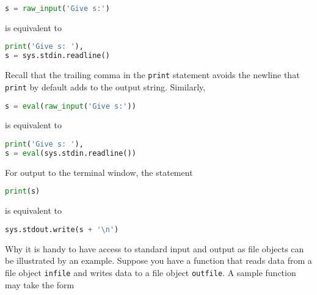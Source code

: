 \documentclass[graybox,sectrefs,envcountresetchap,open=right,final]{svmonodo}
\begin{document}
\begin{lstlisting}[language=python,style=simple,xleftmargin=2mm]
s = raw_input('Give s:')

\end{lstlisting}

is equivalent to




\begin{lstlisting}[language=python,style=simple,xleftmargin=2mm]
print('Give s: '),
s = sys.stdin.readline()

\end{lstlisting}

Recall that the trailing comma in the \texttt{print} statement avoids the
newline that \texttt{print} by default adds to the output string.
Similarly,



\begin{lstlisting}[language=python,style=simple,xleftmargin=2mm]
s = eval(raw_input('Give s:'))

\end{lstlisting}

is equivalent to




\begin{lstlisting}[language=python,style=simple,xleftmargin=2mm]
print('Give s: '),
s = eval(sys.stdin.readline())

\end{lstlisting}

For output to the terminal window, the statement



\begin{lstlisting}[language=python,style=simple,xleftmargin=2mm]
print(s)

\end{lstlisting}

is equivalent to



\begin{lstlisting}[language=python,style=simple,xleftmargin=2mm]
sys.stdout.write(s + '\n')

\end{lstlisting}


Why it is handy to have access to standard input and output
as file objects can be illustrated by an example. Suppose you have a
function that reads data from a file object \texttt{infile}
and writes data to a file object \texttt{outfile}.
A sample function may take the form
\end{document}
